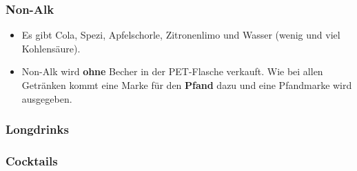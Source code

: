 \subsubsection{Non-Alk}
\begin{itemize}
  \item Es gibt Cola, Spezi, Apfelschorle, Zitronenlimo und Wasser (wenig und viel Kohlensäure).
  \item Non-Alk wird \textbf{ohne} Becher in der PET-Flasche verkauft. Wie bei allen Getränken kommt eine Marke für den \textbf{Pfand} dazu und eine Pfandmarke wird ausgegeben.
\end{itemize}
\subsubsection{Longdrinks}
\subsubsection{Cocktails}
